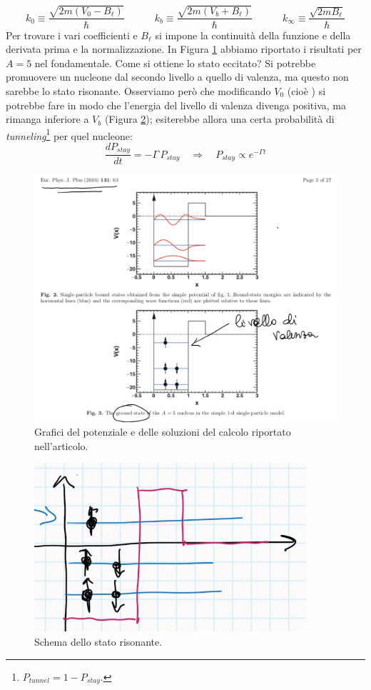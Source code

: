 $$k_0 \equiv \frac{\sqrt{2m(V_0-B_\ell)}}{\hbar}\qquad\quad k_b\equiv\frac{\sqrt{2m(V_b+B_\ell)}}{\hbar}\qquad\quad k_\infty\equiv\frac{\sqrt{2mB_\ell}}{\hbar}$$
Per trovare i vari coefficienti e $B_\ell$ si impone la continuità della funzione e della derivata prima e la normalizzazione. In Figura \ref{0325_ris} abbiamo riportato i risultati per $A=5$ nel fondamentale. Come si ottiene lo stato eccitato? Si potrebbe promuovere un nucleone dal secondo livello a quello di valenza, ma questo non sarebbe lo stato risonante. 
\noindent Osserviamo però che modificando $V_0$ (cioè ) si potrebbe fare in modo che l'energia del livello di valenza divenga positiva, ma rimanga inferiore a $V_b$ (Figura \ref{0325_potris}); esiterebbe allora una certa probabilità di \textit{tunneling}\footnote{$P_{tunnel} = 1 - P_{stay}$.} per quel nucleone:
$$\frac{dP_{stay}}{dt} = -\Gamma \, P_{stay} \quad \Rightarrow \quad P_{stay}\propto e^{-\Gamma t}$$
\begin{figure}[!h]
    \centering
    \includegraphics[scale=0.3]{Immagini/0325_risonanza.png}
    \caption{Grafici del potenziale e delle soluzioni del calcolo riportato nell'articolo.}
    \label{0325_ris}
\end{figure}
\begin{figure}[h]
    \centering
    \includegraphics{Immagini/0325_po_risonanza.png}
    \caption{Schema dello stato risonante.}
    \label{0325_potris}
\end{figure}
